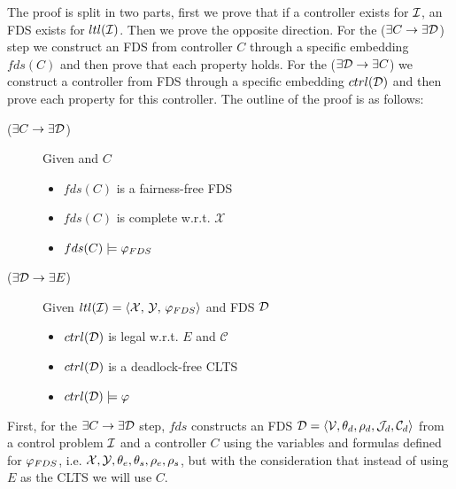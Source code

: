 
The proof is split in two parts, first we prove that if a controller exists for $\mathcal{I}$, an FDS exists for $ltl(\mathcal{I})$. Then we prove the opposite direction. For the ($\exists C \rightarrow \exists \mathcal{D}$) step we construct an FDS from controller $C$ through a specific embedding $fds(C)$ and then prove that each property holds. For the ($\exists \mathcal{D} \rightarrow \exists C$) we construct a controller from FDS \fdsD through a specific embedding $ctrl(\mathcal{D})$ and then prove each property for this controller. The outline of the proof is as follows:

\begin{description}
	\item[($\exists C \rightarrow \exists \mathcal{D}$)] Given \controlProblemDef and $C$
		\begin{itemize}
			\item $fds(C)$ is a fairness-free FDS			
			\item $fds(C)$ is complete w.r.t. $\mathcal{X}$
			\item $fds(C) \models \varphi_{FDS}$
		\end{itemize}
	\item[($\exists \mathcal{D} \rightarrow \exists E$)] Given $\fdsEmbeddingDef$ and FDS $\mathcal{D}$
		\begin{itemize}
			\item $ctrl(\mathcal{D})$ is legal w.r.t. $E$ and $\mathcal{C}$
			\item $ctrl(\mathcal{D})$ is a deadlock-free CLTS			
			\item $ctrl(\mathcal{D}) \models \varphi$
		\end{itemize}	
\end{description}

First,  for the $\exists C \rightarrow \exists \mathcal{D}$ step, $fds$ constructs an FDS $\mathcal{D}=\langle \mathcal V, \theta_d, \rho_d, \mathcal{J}_d, \mathcal{C}_d \rangle$ from a control problem $\mathcal{I}$ and a controller $C$ using the variables and formulas defined for $\varphi_{FDS}$, i.e. ${\mathcal{X}}, {\mathcal{Y}}, {\theta_e}, {\theta_s}, {\rho_e}, {\rho_s}$, but with the consideration that instead of using $E$ as the CLTS we will use $C$.

